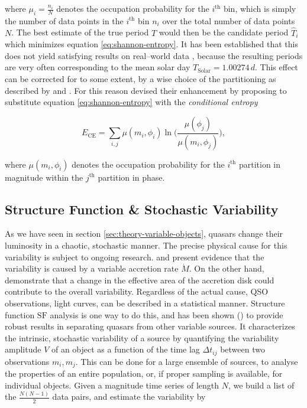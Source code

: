 where $\mu_i = \frac{n_i}{N}$ denotes the occupation probability for the $i^\text{th}$ bin, which is simply the number of data points in the $i^\text{th}$ bin $n_i$ over the total number of data points $N$. The best estimate of the true period $T$ would then be the candidate period $\hat T_i$ which minimizes equation \eqref{eq:shannon-entropy}. It has been established that this does not yield satisfying results on real--world data \citep{cincotta1999}, because the resulting periods are very often corresponding to the mean solar day $T_{\text{Solar}} = 1.00274 \, \unit{d}$. This effect can be corrected for to some extent, \eg by a wise choice of the partitioning as described by \citet{cincotta1999} and \citet{drake2013}. For this reason \citeauthor{graham2013} devised their enhancement by proposing to substitute equation \eqref{eq:shannon-entropy} with the \emph{conditional entropy}

\begin{equation}
E_\text{CE} = \sum_{i,j} \mu(m_i, \phi_i) \ln\big(\frac{\mu(\phi_j)}{\mu(m_i, \phi_j)}\big),
\end{equation}

where $\mu(m_i, \phi_i)$ denotes the occupation probability for the $i^\text{th}$ partition in magnitude within the $j^\text{th}$ partition in phase.\\

\subsection{Structure Function \& Stochastic Variability}
\label{subsec:structure-function}

As we have seen in section \ref{sec:theory-variable-objects}, quasars change their luminosity in a chaotic, stochastic manner. The precise physical cause for this variability is subject to ongoing research. \citet{pereyra2006} and \citet{li2008} present evidence that the variability is caused by a variable accretion rate $\dot M$. On the other hand, \citet{blackburne2010} demonstrate that a change in the effective area of the accretion disk could contribute to the overall variability. Regardless of the actual cause, QSO observations, \eg light curves, can be described in a statistical manner. Structure function $\text{SF}$ analysis \citep{hughes1992,collier2001} is one way to do this, and has been shown (\eg \citet{schmidt2010}) to provide robust results in separating quasars from other variable sources. It characterizes the intrinsic, stochastic variability of a source by quantifying the variability amplitude $V$ of an object as a function of the time lag $\Delta t_{ij}$ between two observations $m_i, m_j$. This can be done for a large ensemble of sources, to analyse the properties of an entire population, or, if proper sampling is available, for individual objects. Given a magnitude time series of length $N$, we build a list of the $\frac{N(N-1)}{2}$ data pairs, and estimate the variability by

